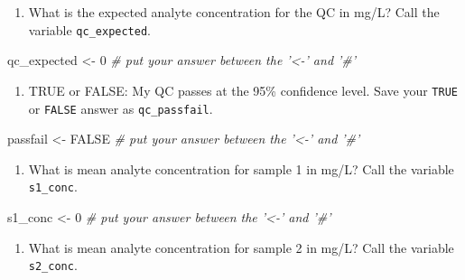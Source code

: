 \documentclass[]{tufte-book}
\newenvironment{Shaded}{}{}
\newcommand{\CommentTok}[1]{\textcolor[rgb]{0.38,0.63,0.69}{\textit{#1}}}
\newcommand{\DecValTok}[1]{\textcolor[rgb]{0.25,0.63,0.44}{#1}}
\newcommand{\NormalTok}[1]{#1}
\newcommand{\OtherTok}[1]{\textcolor[rgb]{0.00,0.44,0.13}{#1}}
\newcommand{\StringTok}[1]{\textcolor[rgb]{0.25,0.44,0.63}{#1}}
\providecommand{\tightlist}{%
  \setlength{\itemsep}{0pt}\setlength{\parskip}{0pt}}
\begin{document}
\begin{enumerate}
\def\labelenumi{\arabic{enumi}.}
\setcounter{enumi}{3}
\tightlist
\item
  What is the expected analyte concentration for the QC in mg/L? Call the variable \texttt{qc\_expected}.
\end{enumerate}

\begin{Shaded}
\begin{Highlighting}[]
\NormalTok{qc_expected <-}\StringTok{ }\DecValTok{0}     \CommentTok{# put your answer between the '<-' and '#'}
\end{Highlighting}
\end{Shaded}

\begin{enumerate}
\def\labelenumi{\arabic{enumi}.}
\setcounter{enumi}{4}
\tightlist
\item
  TRUE or FALSE: My QC passes at the 95\% confidence level. Save your \texttt{TRUE} or \texttt{FALSE} answer as \texttt{qc\_passfail}.
\end{enumerate}

\begin{Shaded}
\begin{Highlighting}[]
\NormalTok{passfail <-}\StringTok{ }\OtherTok{FALSE}     \CommentTok{# put your answer between the '<-' and '#'}
\end{Highlighting}
\end{Shaded}

\begin{enumerate}
\def\labelenumi{\arabic{enumi}.}
\setcounter{enumi}{5}
\tightlist
\item
  What is mean analyte concentration for sample 1 in mg/L? Call the variable \texttt{s1\_conc}.
\end{enumerate}

\begin{Shaded}
\begin{Highlighting}[]
\NormalTok{s1_conc <-}\StringTok{ }\DecValTok{0}     \CommentTok{# put your answer between the '<-' and '#'}
\end{Highlighting}
\end{Shaded}

\begin{enumerate}
\def\labelenumi{\arabic{enumi}.}
\setcounter{enumi}{6}
\tightlist
\item
  What is mean analyte concentration for sample 2 in mg/L? Call the variable \texttt{s2\_conc}.
\end{enumerate}
\end{document}
